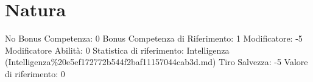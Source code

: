\section{Natura}\label{natura}

\begin{description}
\tightlist
\item[Tags: ABI]
No Bonus Competenza: 0 Bonus Competenza di Riferimento: 1 Modificatore:
-5 Modificatore Abilità: 0 Statistica di riferimento: Intelligenza
(Intelligenza\%20e5ef172772b544f2baf11157044cab3d.md) Tiro Salvezza: -5
Valore di riferimento: 0
\end{description}
